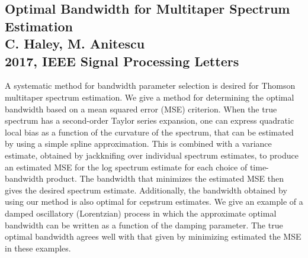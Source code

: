 \documentclass{article}
\begin{document}
\subsection{Optimal Bandwidth for Multitaper Spectrum Estimation \\
C. Haley, M. Anitescu \\
2017, IEEE Signal Processing Letters}
A systematic method for bandwidth parameter selection is desired for Thomson multitaper spectrum estimation. We give a method for determining the optimal bandwidth based on a mean squared error (MSE) criterion. When the true spectrum has a second-order Taylor series expansion, one can express quadratic local bias as a function of the curvature of the spectrum, that can be estimated by using a simple spline approximation. This is combined with a variance estimate, obtained by jackknifing over individual spectrum estimates, to produce an estimated MSE for the log spectrum estimate for each choice of time-bandwidth product. The bandwidth that minimizes the estimated MSE then gives the desired spectrum estimate. Additionally, the bandwidth obtained by using our method is also optimal for cepstrum estimates. We give an example of a damped oscillatory (Lorentzian) process in which the approximate optimal bandwidth can be written as a function of the damping parameter. The true optimal bandwidth agrees well with that given by minimizing estimated the MSE in these examples. \\

\\
\end{document}
